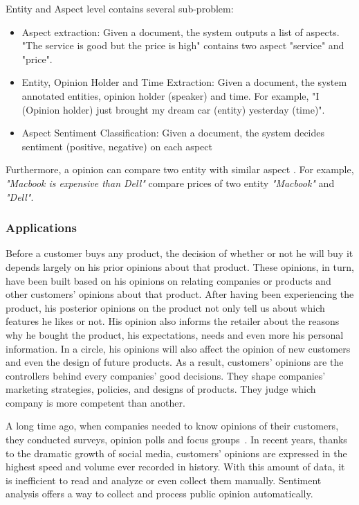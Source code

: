 Entity and Aspect level contains several sub-problem:
\begin{itemize}
    \item Aspect extraction: Given a document, the system outputs a list of aspects. "The service is good but the price is high" contains two aspect "service" and "price".
    \item Entity, Opinion Holder and Time Extraction: Given a document, the system annotated entities, opinion holder (speaker) and time. For example, "I (Opinion holder) just brought my dream car (entity) yesterday (time)".
    \item Aspect Sentiment Classification: Given a document, the system decides sentiment (positive, negative) on each aspect
\end{itemize}

 Furthermore, a opinion can compare two entity with similar aspect \cite{jindal2006mining}. For example, \textit{"Macbook is expensive than Dell"} compare prices of two entity \textit{"Macbook"} and \textit{"Dell"}.

\subsubsection{Applications}
Before a customer buys any product, the decision of whether or not he will buy it depends largely on his prior opinions about that product.
These opinions, in turn, have been built based on his opinions on relating companies or products and other customers' opinions about that product.
After having been experiencing the product, his posterior opinions on the product not only tell us about which features he likes or not.
His opinion also informs the retailer about the reasons why he bought the product, his expectations, needs and even more his personal information.
In a circle, his opinions will also affect the opinion of new customers and even the design of future products.
As a result, customers' opinions are the controllers behind every companies' good decisions.
They shape companies' marketing strategies, policies, and designs of products.
They judge which company is more competent than another.

A long time ago, when companies needed to know opinions of their customers, they conducted surveys, opinion polls and focus groups~\cite{liu2012sentiment}.
In recent years, thanks to the dramatic growth of social media, customers' opinions are expressed in the highest speed and volume ever recorded in history.
With this amount of data, it is inefficient to read and analyze or even collect them manually. Sentiment analysis offers a way to collect and process public opinion automatically.

